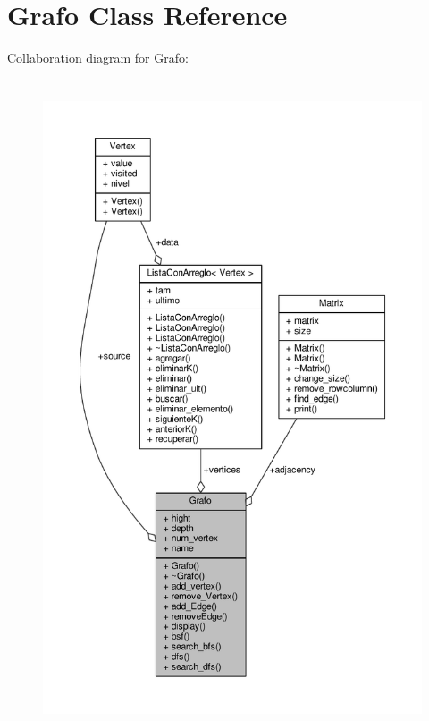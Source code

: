 \hypertarget{class_grafo}{\section{Grafo Class Reference}
\label{class_grafo}
}


Collaboration diagram for Grafo\+:
\nopagebreak
\begin{figure}[H]
\begin{center}
\leavevmode
\includegraphics[height=550pt]{class_grafo__coll__graph}
\end{center}
\end{figure}
